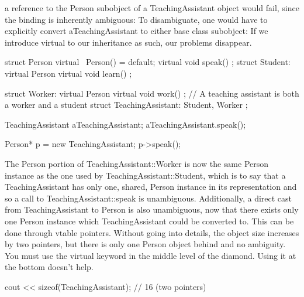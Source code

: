 \documentclass{report}
\begin{document}
a reference to the Person subobject of a TeachingAssistant object
would fail, since the binding is inherently ambiguous:
\bigbreak \noindent 
To disambiguate, one would have to explicitly convert
aTeachingAssistant to either base class subobject:
\bigbreak \noindent 
If we introduce virtual to our inheritance as such, our problems disappear.
\bigbreak \noindent 
\begin{cppcode}
    struct Person {
        virtual ~Person() = default;
        virtual void speak() {}
    };
    struct Student: virtual Person {
        virtual void learn() {}
    };

    struct Worker: virtual Person {
        virtual void work() {}
    }; // A teaching assistant is both a worker and a student
    struct TeachingAssistant: Student, Worker {};

    TeachingAssistant aTeachingAssistant;
    aTeachingAssistant.speak();

    Person* p = new TeachingAssistant{};
    p->speak();
\end{cppcode}
\bigbreak \noindent 
The Person portion of TeachingAssistant::Worker is now the same
Person instance as the one used by TeachingAssistant::Student,
which is to say that a TeachingAssistant has only one,
shared, Person instance in its representation and so a call
to TeachingAssistant::speak is unambiguous. Additionally,
a direct cast from TeachingAssistant to Person is also
unambiguous, now that there exists only one Person instance
which TeachingAssistant could be converted to.
\bigbreak \noindent 
This can be done through vtable pointers. Without going into
details, the object size increases by two pointers, but there is only
one Person object behind and no ambiguity.
\bigbreak \noindent 
You must use the virtual keyword in the middle level of the
diamond. Using it at the bottom doesn’t help.
\bigbreak \noindent 
\begin{cppcode}
    cout << sizeof(TeachingAssistant); // 16 (two pointers)
\end{cppcode}

\bigbreak \noindent 
\end{document}
